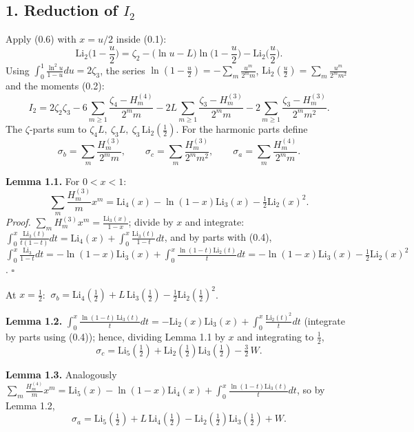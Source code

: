 \documentclass[11pt]{article}
\theoremstyle{remark}
\begin{document}
\subsection*{1. Reduction of $I_2$}

Apply (0.6) with $x=u/2$ inside (0.1):
\[
\mathrm{Li}_2\Big(1-\frac u2\Big)=\zeta_2-\big(\ln u-L\big)\ln\Big(1-\frac u2\Big)-\mathrm{Li}_2\Big(\frac u2\Big).
\]
Using $\int_0^1\frac{\ln^2u}{1-u}du=2\zeta_3$, the series $\ln(1-\tfrac u2)=-\sum_m\frac{u^m}{2^mm}$, $\mathrm{Li}_2(\tfrac u2)=\sum_m\frac{u^m}{2^mm^2}$ and the moments (0.2):
\begin{equation*}
I_2=2\zeta_2\zeta_3-6\sum_{m\ge1}\frac{\zeta_4-H^{(4)}_m}{2^mm}
-2L\sum_{m\ge1}\frac{\zeta_3-H^{(3)}_m}{2^mm}
-2\sum_{m\ge1}\frac{\zeta_3-H^{(3)}_m}{2^mm^2}. \tag{1.1}
\end{equation*}
The $\zeta$-parts sum to $\zeta_4 L,\ \zeta_3L,\ \zeta_3\,\mathrm{Li}_2(\tfrac12)$. For the harmonic parts define
\[
\sigma_b=\sum_m\frac{H^{(3)}_m}{2^mm},\qquad
\sigma_c=\sum_m\frac{H^{(3)}_m}{2^mm^2},\qquad
\sigma_a=\sum_m\frac{H^{(4)}_m}{2^mm}.
\]

\textbf{Lemma 1.1.} For $0<x<1$:
\[
\sum_m\frac{H^{(3)}_m}{m}x^m=\mathrm{Li}_4(x)-\ln(1-x)\mathrm{Li}_3(x)-\tfrac12\mathrm{Li}_2(x)^2 .
\]
\textit{Proof.} $\sum_mH_m^{(3)}x^m=\frac{\mathrm{Li}_3(x)}{1-x}$; divide by $x$ and integrate:
$\int_0^x\frac{\mathrm{Li}_3(t)}{t(1-t)}dt=\mathrm{Li}_4(x)+\int_0^x\frac{\mathrm{Li}_3(t)}{1-t}dt$, and by parts with (0.4),
$\int_0^x\frac{\mathrm{Li}_3}{1-t}dt=-\ln(1-x)\mathrm{Li}_3(x)+\int_0^x\frac{\ln(1-t)\mathrm{Li}_2(t)}{t}dt=-\ln(1-x)\mathrm{Li}_3(x)-\tfrac12\mathrm{Li}_2(x)^2$. $\square$

At $x=\tfrac12$: $\ \sigma_b=\mathrm{Li}_4(\tfrac12)+L\,\mathrm{Li}_3(\tfrac12)-\tfrac12\mathrm{Li}_2(\tfrac12)^2$.

\textbf{Lemma 1.2.} $\displaystyle\int_0^x\frac{\ln(1-t)\,\mathrm{Li}_3(t)}{t}dt=-\mathrm{Li}_2(x)\mathrm{Li}_3(x)+\int_0^x\frac{\mathrm{Li}_2(t)^2}{t}dt$ (integrate by parts using (0.4)); hence, dividing Lemma 1.1 by $x$ and integrating to $\tfrac12$,
\[
\sigma_c=\mathrm{Li}_5(\tfrac12)+\mathrm{Li}_2(\tfrac12)\mathrm{Li}_3(\tfrac12)-\tfrac32\,W .
\]

\textbf{Lemma 1.3.} Analogously $\sum_m\frac{H^{(4)}_m}{m}x^m=\mathrm{Li}_5(x)-\ln(1-x)\mathrm{Li}_4(x)+\int_0^x\frac{\ln(1-t)\mathrm{Li}_3(t)}{t}dt$, so by Lemma 1.2,
\[
\sigma_a=\mathrm{Li}_5(\tfrac12)+L\,\mathrm{Li}_4(\tfrac12)-\mathrm{Li}_2(\tfrac12)\mathrm{Li}_3(\tfrac12)+W .
\]
\end{document}
